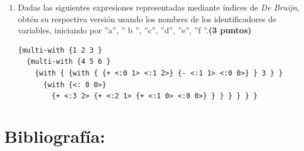 \documentclass[11pt]{article}
\begin{document}
\begin{enumerate}[leftmargin=0.8cm]
    \item Dadas las siguientes expresiones representadas mediante índices de \textit{De Bruijn}, obtén su respectiva versión usando los nombres de los identificadores de variables, iniciando por ”a”, ” b ”, ”c”, ”d”, ”e”, ”f ”.\textbf{(3 puntos)}

    \begin{lstlisting}
{multi-with {1 2 3 }
  {multi-with {4 5 6 }
    {with { {with { {+ <:0 1> <:1 2>} {- <:1 1> <:0 0>} } 3 } }
      {with {<: 0 0>}
        {+ <:3 2> {+ <:2 1> {+ <:1 0> <:0 0>} } } } } } }
    \end{lstlisting}

\end{enumerate}

\section*{Bibliografía:}
\end{document}
